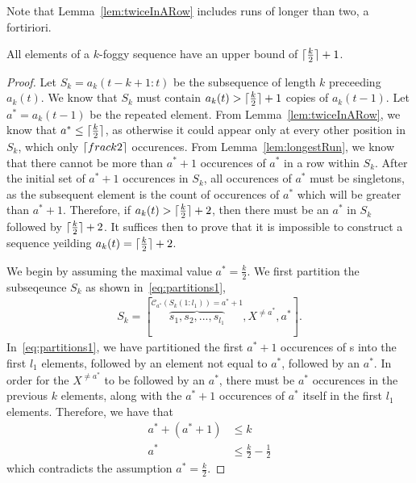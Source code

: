 \documentclass[12pt,reqno]{article}
\DeclarePairedDelimiter\ceil{\lceil}{\rceil}
\begin{document}
Note that Lemma~\ref{lem:twiceInARow} includes runs of longer than two, a fortiriori. 

\begin{theorem}\label{thm:elementUpperBound}
All elements of a $k$-foggy sequence have an upper bound of $\ceil{\frac{k}{2}}+1$.
\end{theorem}

\begin{proof}
Let $S_k = a_k(t-k+1:t)$ be the subsequence of length $k$ preceeding $a_k(t)$. We know that $S_k$ must contain $a_k(t) > \ceil{\frac{k}{2}}+1$ copies of $a_k(t-1)$. Let $a^*=a_k(t-1)$ be the repeated element. From Lemma~\ref{lem:twiceInARow}, we know that $a^*\leq \ceil{\frac{k}{2}}$, as otherwise it could appear only at every other position in $S_k$, which only $\ceil{frac{k}{2}}$ occurences. From Lemma~\ref{lem:longestRun}, we know that there cannot be more than $a^*+1$ occurences of $a^*$ in a row within $S_k$. After the initial set of $a^*+1$ occurences in $S_k$, all occurences of $a^*$ must be singletons, as the subsequent element is the count of occurences of $a^*$ which will be greater than $a^*+1$. Therefore, if $a_k(t)> \ceil{\frac{k}{2}}+2$, then there must be an $a^*$ in $S_k$ followed by $\ceil{\frac{k}{2}}+2$. It suffices then to prove that it is impossible to construct a sequence yeilding $a_k(t) = \ceil{\frac{k}{2}}+2$.

We begin by assuming the maximal value $a^* = \frac{k}{2}$. We first partition the subseqeunce $S_k$ as shown in~\eqref{eq:partitions1},
\begin{align}
S_k = [\overbrace{s_1,s_2,...,s_{l_1}}^{\mathcal{C}_{a^*}(S_k(1:l_1)) = a^*+1},X^{\neq a^*},a^*].\label{eq:partitions1}
\end{align}
In~\eqref{eq:partitions1}, we have partitioned the first $a^*+1$ occurences of s into the first $l_1$ elements, followed by an element not equal to $a^*$, followed by an $a^*$. In order for the $X^{\neq a^*}$ to be followed by an $a^*$, there must be $a^*$ occurences in the previous $k$ elements, along with the $a^*+1$ occurences of $a^*$ itself in the first $l_1$ elements. Therefore, we have that
\begin{align}
a^* + (a^*+1) &\leq k \\
a^* &\leq \frac{k}{2}-\frac{1}{2} 
\end{align}
which contradicts the assumption $a^*=\frac{k}{2}$. 


\end{proof}
\end{document}
